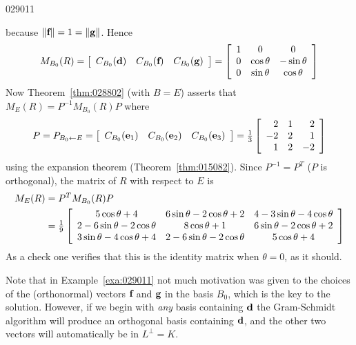 \begin{example}{}{029011}
\begin{solution}
\begin{wrapfigure}[7]{l}{5cm}
	\centering
	
\end{wrapfigure}

because $\|\textbf{f}\| = 1 = \|\textbf{g}\|$. Hence
\begin{equation*}
M_{B_0}(R) = \left[ \begin{array}{ccc} C_{B_0}(\textbf{d}) & C_{B_0}(\textbf{f}) & C_{B_0}(\textbf{g}) \end{array} \right] = \left[ \begin{array}{ccc} 1 & 0 & 0 \\ 0 & \cos \theta & -\sin \theta \\ 0 & \sin \theta & \cos \theta \end{array} \right]
\end{equation*}
Now Theorem~\ref{thm:028802} (with $B = E$) asserts that $M_E(R) = P^{-1}M_{B_0}(R)P$ where
\begin{equation*}
P = P_{B_0 \gets E} = \left[ \begin{array}{ccc} C_{B_0}(\textbf{e}_1) & C_{B_0}(\textbf{e}_2) & C_{B_0}(\textbf{e}_3) \end{array} \right] = \tfrac{1}{3} \left[ \begin{array}{rrr} 2 & 1 & 2 \\ -2 & 2 & 1 \\ 1 & 2 & -2 \end{array} \right]
\end{equation*}
using the expansion theorem (Theorem~\ref{thm:015082}). Since $P^{-1} = P^{T}$ ($P$ is orthogonal), the matrix of $R$ with respect to $E$ is
\begin{align*}
M_E(R) & = P^TM_{B_0}(R)P \\
& = \tfrac{1}{9} \left[ \begin{array}{ccc} 5 \cos \theta + 4 & 6 \sin \theta - 2 \cos \theta + 2 & 4 - 3 \sin \theta - 4 \cos \theta \\ 2 - 6 \sin \theta - 2 \cos \theta & 8 \cos \theta + 1 & 6 \sin \theta - 2 \cos \theta + 2 \\ 3 \sin \theta - 4 \cos \theta + 4 & 2 - 6 \sin \theta - 2 \cos \theta & 5 \cos \theta + 4 \end{array} \right]
\end{align*}
As a check one verifies that this is the identity matrix when $\theta = 0$, as it should.
\end{solution}
\end{example}
\vspace{-1em}
Note that in Example~\ref{exa:029011} not much motivation was given to the choices of the (orthonormal) vectors $\textbf{f}$ and $\textbf{g}$ in the basis $B_{0}$, which is the key to the solution. However, if we begin with \textit{any} basis containing $\textbf{d}$ the Gram-Schmidt algorithm will produce an orthogonal basis containing $\textbf{d}$, and the other two vectors will automatically be in $L^{\perp} = K$.


